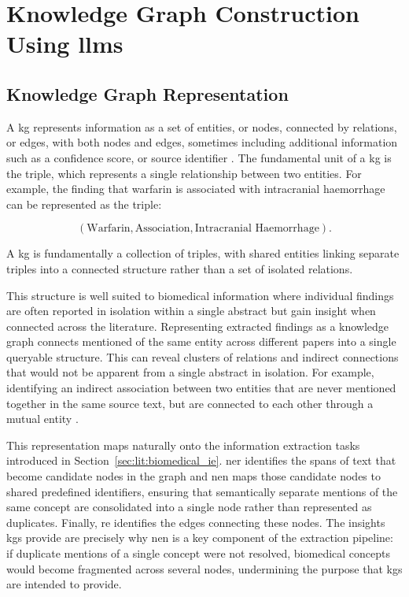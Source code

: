 \section{Knowledge Graph Construction Using \glspl{llm}}
\label{sec:lit:kg_construction_using_llms}

\subsection{Knowledge Graph Representation}
\label{subsec:lit:kg_representation}
A \gls{kg} represents information as a set of entities, or nodes, connected by relations, or edges, with both nodes and edges, sometimes including additional information such as a confidence score, or source identifier \pref. The fundamental unit of a \gls{kg} is the triple, which represents a single relationship between two entities. For example, the finding that warfarin is associated with intracranial haemorrhage can be represented as the triple:

\[
(\text{Warfarin},
\text{Association},
\text{Intracranial Haemorrhage}).
\]

\noindent A \gls{kg} is fundamentally a collection of triples, with shared entities linking separate triples into a connected structure rather than a set of isolated relations.

This structure is well suited to biomedical information where individual findings are often reported in isolation within a single abstract but gain insight when connected across the literature. Representing extracted findings as a knowledge graph connects mentioned of the same entity across different papers into a single queryable structure. This can reveal clusters of relations and indirect connections that would not be apparent from a single abstract in isolation. For example, identifying an indirect association between two entities that are never mentioned together in the same source text, but are connected to each other through a mutual entity \pref.

This representation maps naturally onto the information extraction tasks introduced in Section~\ref{sec:lit:biomedical_ie}. \gls{ner} identifies the spans of text that become candidate nodes in the graph and \gls{nen} maps those candidate nodes to shared predefined identifiers, ensuring that semantically separate mentions of the same concept are consolidated into a single node rather than represented as duplicates. Finally, \gls{re} identifies the edges connecting these nodes. The insights \glspl{kg} provide are precisely why \gls{nen} is a key component of the extraction pipeline: if duplicate mentions of a single concept were not resolved, biomedical concepts would become fragmented across several nodes, undermining the purpose that \glspl{kg} are intended to provide.

